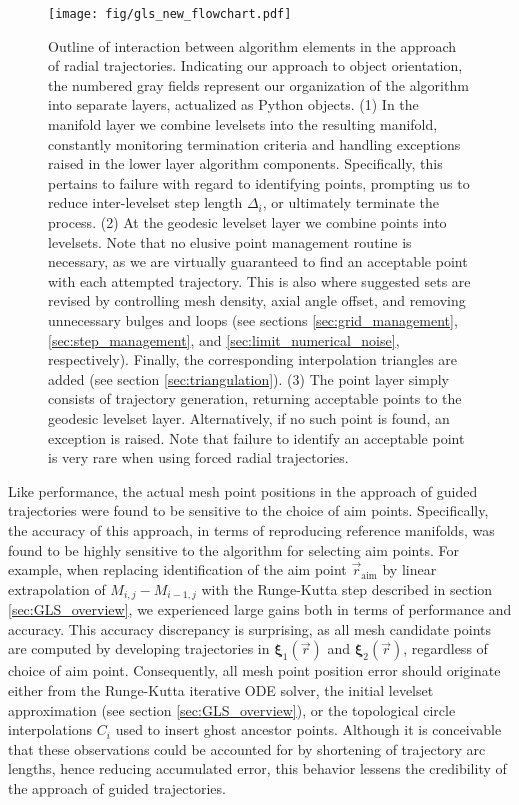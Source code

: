 \begin{figure}[h!] 
\centering
\texttt{[image: fig/gls\_new\_flowchart.pdf]}
\caption{Outline of interaction between algorithm elements in the approach of radial trajectories. Indicating our approach to object orientation, the numbered gray fields represent our organization of the algorithm into separate layers, actualized as Python objects. (1) In the manifold layer we combine levelsets into the resulting manifold, constantly monitoring termination criteria and handling exceptions raised in the lower layer algorithm components. Specifically, this pertains to failure with regard to identifying points, prompting us to reduce inter-levelset step length $\Delta_i$, or ultimately terminate the process. (2) At the geodesic levelset layer we combine points into levelsets. Note that no elusive point management routine is necessary, as we are virtually guaranteed to find an acceptable point with each attempted trajectory. This is also where suggested sets are revised by controlling mesh density, axial angle offset, and removing unnecessary bulges and loops (see sections \ref{sec:grid_management}, \ref{sec:step_management}, and \ref{sec:limit_numerical_noise}, respectively). Finally, the corresponding interpolation triangles are added (see section \ref{sec:triangulation}). (3) The point layer simply consists of trajectory generation, returning acceptable points to the geodesic levelset layer. Alternatively, if no such point is found, an exception is raised. Note that failure to identify an acceptable point is very rare when using forced radial trajectories.}\label{fig:gls_new_flowchart}
\end{figure}

Like performance, the actual mesh point positions in the approach of guided trajectories were found to be sensitive to the choice of aim points. Specifically, the accuracy of this approach, in terms of reproducing reference manifolds, was found to be highly sensitive to the algorithm for selecting aim points. For example, when replacing identification of the aim point $\vec{r}_{\text{aim}}$ by linear extrapolation of $M_{i,j}-M_{i-1,j}$ with the Runge-Kutta step described in section \ref{sec:GLS_overview}, we experienced large gains both in terms of performance and accuracy. This accuracy discrepancy is surprising, as all mesh candidate points are computed by developing trajectories in $\bm{\xi}_1(\vec{r})$  and $\bm{\xi}_2(\vec{r})$, regardless of choice of aim point. Consequently, all mesh point position error should originate either from the Runge-Kutta iterative ODE solver, the initial levelset approximation (see section \ref{sec:GLS_overview}), or the topological circle interpolations $C_i$ used to insert ghost ancestor points. Although it is conceivable that these observations could be accounted for by shortening of trajectory arc lengths, hence reducing accumulated error, this behavior lessens the credibility of the approach of guided trajectories.

